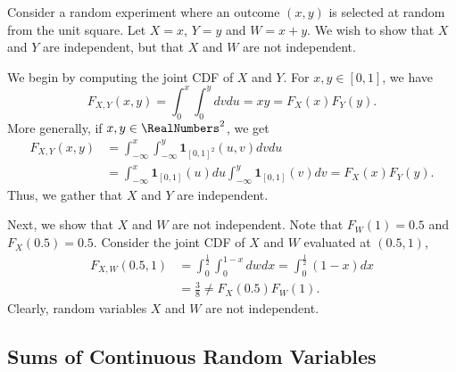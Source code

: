 \begin{example}
Consider a random experiment where an outcome $(x, y)$ is selected at random from the unit square.
Let $X = x$, $Y = y$ and $W = x + y$.
We wish to show that $X$ and $Y$ are independent, but that $X$ and $W$ are not independent.

We begin by computing the joint CDF of $X$ and $Y$.
For $x,y \in [0,1]$, we have
\begin{equation*}
F_{X,Y}(x,y) = \int_0^{x} \int_0^{y} dv du
= x y = F_X(x) F_Y(y) .
\end{equation*}
More generally, if $x, y \in \RealNumbers^2$, we get
\begin{equation*}
\begin{split}
F_{X,Y}(x,y)
&= \int_{-\infty}^{x} \int_{-\infty}^{y}
\mathbf{1}_{[0,1]^2} (u, v) dv du \\
&= \int_{-\infty}^{x} \mathbf{1}_{[0,1]} (u) du
\int_{-\infty}^{y} \mathbf{1}_{[0,1]} (v) dv
= F_X(x) F_Y(y) .
\end{split}
\end{equation*}
Thus, we gather that $X$ and $Y$ are independent.

Next, we show that $X$ and $W$ are not independent.
Note that $F_W (1) = 0.5$ and $F_X (0.5) = 0.5$.
Consider the joint CDF of $X$ and $W$ evaluated at $(0.5, 1)$,
\begin{equation*}
\begin{split}
F_{X,W} (0.5, 1)
&= \int_{0}^{\frac{1}{2}} \int_{0}^{1-x} dw dx
= \int_{0}^{\frac{1}{2}} (1 - x) dx \\
&= \frac{3}{8}
\neq F_X (0.5) F_W(1) .
\end{split}
\end{equation*}
Clearly, random variables $X$ and $W$ are not independent.
\end{example}


\subsection{Sums of Continuous Random Variables}

